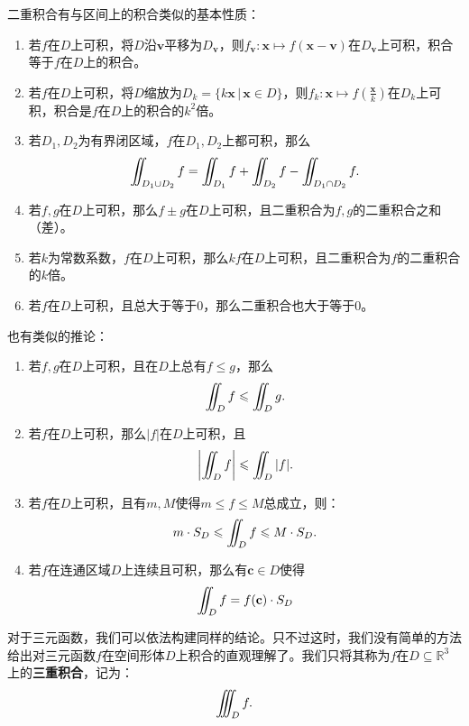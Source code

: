\documentclass[12pt,UTF8,fontset=none]{ctexbook}
\begin{document}
二重积合有与区间上的积合类似的基本性质：
\begin{enumerate}[label=\arabic*.]
    \item 若$f$在$D$上可积，将$D$沿$\mathbf{v}$平移为$D_{\mathbf{v}}$，则$f_{\mathbf{v}}: \mathbf{x} \mapsto f(\mathbf{x}-\mathbf{v})$在$D_{\mathbf{v}}$上可积，积合等于$f$在$D$上的积合。
    \item 若$f$在$D$上可积，将$D$缩放为$D_{k}=\{k\mathbf{x}\,|\,\mathbf{x}\in D\}$，则$f_k: \mathbf{x}\mapsto f(\frac{\mathbf{x}}{k})$在$D_k$上可积，积合是$f$在$D$上的积合的$k^2$倍。
    \item 若$D_1,D_2$为有界闭区域，$f$在$D_1,D_2$上都可积，那么
    $$ \jii_{D_1\cup D_2} f = \jii_{D_1} f + \jii_{D_2} f - \jii_{D_1\cap D_2} f.$$
    \item 若$f,g$在$D$上可积，那么$f\pm g$在$D$上可积，且二重积合为$f,g$的二重积合之和（差）。
    \item 若$k$为常数系数，$f$在$D$上可积，那么$kf$在$D$上可积，且二重积合为$f$的二重积合的$k$倍。
    \item 若$f$在$D$上可积，且总大于等于$0$，那么二重积合也大于等于$0$。
\end{enumerate}
也有类似的推论：
\begin{enumerate}[label=\arabic*.]
    \item 若$f,g$在$D$上可积，且在$D$上总有$f\leqslant g$，那么
    $$ \jii_{D} f \leqslant \jii_{D} g. $$
    \item 若$f$在$D$上可积，那么$|f|$在$D$上可积，且
    $$ \left|\jii_{D} f\right| \leqslant \jii_{D} |f|. $$
    \item 若$f$在$D$上可积，且有$m,M$使得$m\leqslant f\leqslant M$总成立，则：
    $$ m\cdot S_D\leqslant \int\!\!\!\!\!\int_{D} f \leqslant M\cdot S_D. $$
    \item 若$f$在连通区域$D$上连续且可积，那么有$\mathbf{c}\in D$使得
    $$ \int\!\!\!\!\!\int_{D} f = f(\mathbf{c}) \cdot S_D $$
\end{enumerate}

对于三元函数，我们可以依法构建同样的结论。只不过这时，我们没有简单的方法给出对三元函数$f$在空间形体$D$上积合的直观理解了。我们只将其称为$f$在$D\subseteq \mathbb{R}^3$上的\textbf{三重积合}，记为：
$$ \jiii_{D} f. $$ 

\end{document}
